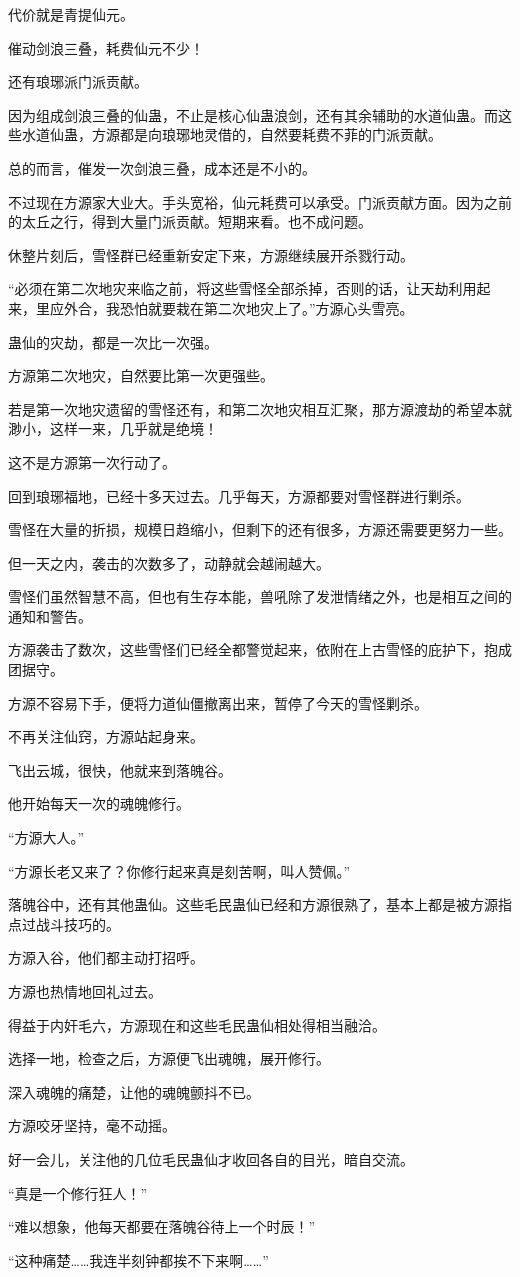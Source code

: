 \begin{this_body}
代价就是青提仙元。

催动剑浪三叠，耗费仙元不少！

还有琅琊派门派贡献。

因为组成剑浪三叠的仙蛊，不止是核心仙蛊浪剑，还有其余辅助的水道仙蛊。而这些水道仙蛊，方源都是向琅琊地灵借的，自然要耗费不菲的门派贡献。

总的而言，催发一次剑浪三叠，成本还是不小的。

不过现在方源家大业大。手头宽裕，仙元耗费可以承受。门派贡献方面。因为之前的太丘之行，得到大量门派贡献。短期来看。也不成问题。

休整片刻后，雪怪群已经重新安定下来，方源继续展开杀戮行动。

“必须在第二次地灾来临之前，将这些雪怪全部杀掉，否则的话，让天劫利用起来，里应外合，我恐怕就要栽在第二次地灾上了。”方源心头雪亮。

蛊仙的灾劫，都是一次比一次强。

方源第二次地灾，自然要比第一次更强些。

若是第一次地灾遗留的雪怪还有，和第二次地灾相互汇聚，那方源渡劫的希望本就渺小，这样一来，几乎就是绝境！

这不是方源第一次行动了。

回到琅琊福地，已经十多天过去。几乎每天，方源都要对雪怪群进行剿杀。

雪怪在大量的折损，规模日趋缩小，但剩下的还有很多，方源还需要更努力一些。

但一天之内，袭击的次数多了，动静就会越闹越大。

雪怪们虽然智慧不高，但也有生存本能，兽吼除了发泄情绪之外，也是相互之间的通知和警告。

方源袭击了数次，这些雪怪们已经全都警觉起来，依附在上古雪怪的庇护下，抱成团据守。

方源不容易下手，便将力道仙僵撤离出来，暂停了今天的雪怪剿杀。

不再关注仙窍，方源站起身来。

飞出云城，很快，他就来到落魄谷。

他开始每天一次的魂魄修行。

“方源大人。”

“方源长老又来了？你修行起来真是刻苦啊，叫人赞佩。”

落魄谷中，还有其他蛊仙。这些毛民蛊仙已经和方源很熟了，基本上都是被方源指点过战斗技巧的。

方源入谷，他们都主动打招呼。

方源也热情地回礼过去。

得益于内奸毛六，方源现在和这些毛民蛊仙相处得相当融洽。

选择一地，检查之后，方源便飞出魂魄，展开修行。

深入魂魄的痛楚，让他的魂魄颤抖不已。

方源咬牙坚持，毫不动摇。

好一会儿，关注他的几位毛民蛊仙才收回各自的目光，暗自交流。

“真是一个修行狂人！”

“难以想象，他每天都要在落魄谷待上一个时辰！”

“这种痛楚……我连半刻钟都挨不下来啊……”

\end{this_body}

